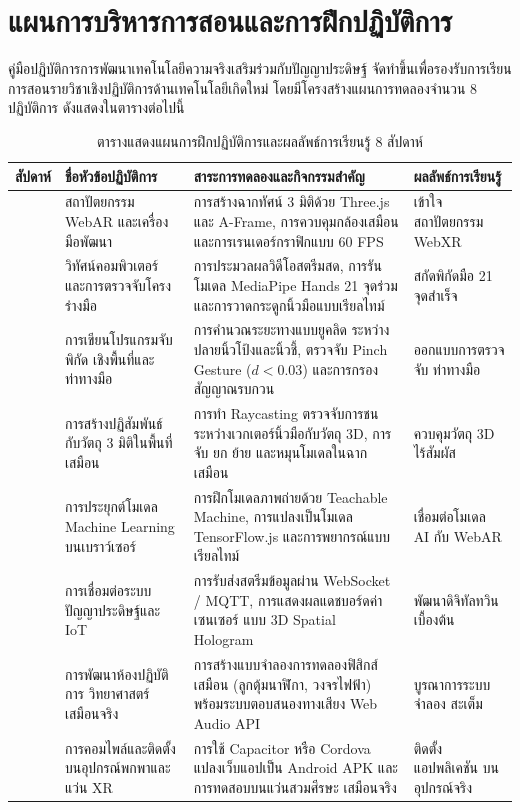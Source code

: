 \chapter*{แผนการบริหารการสอนและการฝึกปฏิบัติการ}

คู่มือปฏิบัติการการพัฒนาเทคโนโลยีความจริงเสริมร่วมกับปัญญาประดิษฐ์ จัดทำขึ้นเพื่อรองรับการเรียนการสอนรายวิชาเชิงปฏิบัติการด้านเทคโนโลยีเกิดใหม่ โดยมีโครงสร้างแผนการทดลองจำนวน 8 ปฏิบัติการ ดังแสดงในตารางต่อไปนี้

\vspace{0.4cm}
\begin{table}[htbp]
\centering
\small
\begin{tabularx}{\textwidth}{>{\centering\arraybackslash}p{1.2cm} >{\raggedright\arraybackslash}p{3.8cm} >{\raggedright\arraybackslash}X >{\raggedright\arraybackslash}p{2.5cm}}
\toprule
\textbf{สัปดาห์} & \textbf{ชื่อหัวข้อปฏิบัติการ} & \textbf{สาระการทดลองและกิจกรรมสำคัญ} & \textbf{ผลลัพธ์การเรียนรู้} \\
\midrule
1 & สถาปัตยกรรม WebAR และเครื่องมือพัฒนา & การสร้างฉากทัศน์ 3 มิติด้วย Three.js และ A-Frame, การควบคุมกล้องเสมือน และการเรนเดอร์กราฟิกแบบ 60 FPS & เข้าใจสถาปัตยกรรม WebXR \\
2 & วิทัศน์คอมพิวเตอร์ และการตรวจจับโครงร่างมือ & การประมวลผลวิดีโอสตรีมสด, การรันโมเดล MediaPipe Hands 21 จุดร่วม และการวาดกระดูกนิ้วมือแบบเรียลไทม์ & สกัดพิกัดมือ 21 จุดสำเร็จ \\
3 & การเขียนโปรแกรมจับพิกัด เชิงพื้นที่และท่าทางมือ & การคำนวณระยะทางแบบยูคลิด ระหว่างปลายนิ้วโป้งและนิ้วชี้, ตรวจจับ Pinch Gesture ($d < 0.03$) และการกรองสัญญาณรบกวน & ออกแบบการตรวจจับ ท่าทางมือ \\
4 & การสร้างปฏิสัมพันธ์ กับวัตถุ 3 มิติในพื้นที่เสมือน & การทำ Raycasting ตรวจจับการชน ระหว่างเวกเตอร์นิ้วมือกับวัตถุ 3D, การจับ ยก ย้าย และหมุนโมเดลในฉากเสมือน & ควบคุมวัตถุ 3D ไร้สัมผัส \\
5 & การประยุกต์โมเดล Machine Learning บนเบราว์เซอร์ & การฝึกโมเดลภาพถ่ายด้วย Teachable Machine, การแปลงเป็นโมเดล TensorFlow.js และการพยากรณ์แบบเรียลไทม์ & เชื่อมต่อโมเดล AI กับ WebAR \\
6 & การเชื่อมต่อระบบ ปัญญาประดิษฐ์และ IoT & การรับส่งสตรีมข้อมูลผ่าน WebSocket / MQTT, การแสดงผลแดชบอร์ดค่าเซนเซอร์ แบบ 3D Spatial Hologram & พัฒนาดิจิทัลทวิน เบื้องต้น \\
7 & การพัฒนาห้องปฏิบัติการ วิทยาศาสตร์เสมือนจริง & การสร้างแบบจำลองการทดลองฟิสิกส์ เสมือน (ลูกตุ้มนาฬิกา, วงจรไฟฟ้า) พร้อมระบบตอบสนองทางเสียง Web Audio API & บูรณาการระบบจำลอง สะเต็ม \\
8 & การคอมไพล์และติดตั้ง บนอุปกรณ์พกพาและแว่น XR & การใช้ Capacitor หรือ Cordova แปลงเว็บแอปเป็น Android APK และการทดสอบบนแว่นสวมศีรษะ เสมือนจริง & ติดตั้งแอปพลิเคชัน บนอุปกรณ์จริง \\
\bottomrule
\end{tabularx}
\caption*{ตารางแสดงแผนการฝึกปฏิบัติการและผลลัพธ์การเรียนรู้ 8 สัปดาห์}
\end{table}
